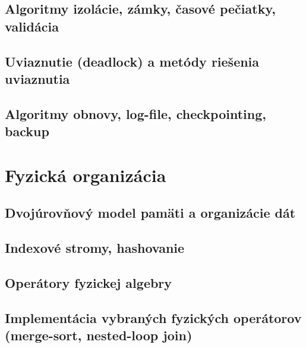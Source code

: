 \documentclass[10pt,a4paper]{article}
\begin{document}
\subsection{Algoritmy izolácie, zámky, časové pečiatky, validácia}
\subsection{Uviaznutie (deadlock) a metódy riešenia uviaznutia}
\subsection{Algoritmy obnovy, log-file, checkpointing, backup}
    
\section{Fyzická organizácia} 
\label{fyzicka_organizacia}

\subsection{Dvojúrovňový model pamäti a organizácie dát}
\subsection{Indexové stromy, hashovanie}
\subsection{Operátory fyzickej algebry}
\subsection{Implementácia vybraných fyzických operátorov (merge-sort, nested-loop join)}


\clearpage
\end{document}
